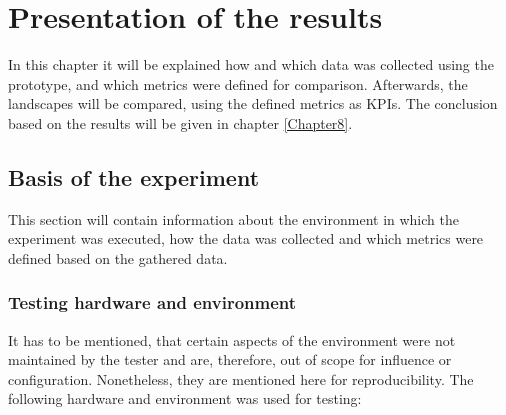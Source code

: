 \chapter{Presentation of the results} %
\label{Chapter7}


In this chapter it will be explained how and which data was collected using the prototype, and which metrics were defined for comparison.
Afterwards, the landscapes will be compared, using the defined metrics as KPIs. The conclusion based on the results will be given in chapter \ref{Chapter8}.

\section{Basis of the experiment} 

This section will contain information about the environment in which the experiment was executed, how the data was collected and which metrics were defined based on the gathered data.

\subsection{Testing hardware and environment}

It has to be mentioned, that certain aspects of the environment were not maintained by the tester and are, therefore, out of scope for influence or configuration. Nonetheless, they are mentioned here for reproducibility.
The following hardware and environment was used for testing:

